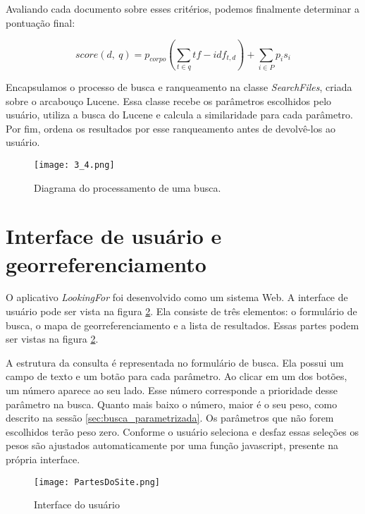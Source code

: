 Avaliando cada documento sobre esses critérios, podemos finalmente determinar a pontuação final:

\begin{displaymath}
	score(d,\ q) = p_{corpo} \left(\sum_{t \in q} tf - idf_{t,d}\right) + \sum_{i \in P} p_{i} s_{i}
\end{displaymath}

Encapsulamos o processo de busca e ranqueamento na classe \emph{SearchFiles}, criada sobre o arcabouço Lucene. Essa classe recebe os parâmetros escolhidos pelo usuário, utiliza a busca do Lucene e calcula a similaridade para cada parâmetro. Por fim, ordena os resultados por esse ranqueamento antes de devolvê-los ao usuário.

\begin{figure}[!h]
  \centering
  \texttt{[image: 3\_4.png]} 
  \caption{Diagrama do processamento de uma busca.}
  \label{fig:diagproc} 
\end{figure}

\section{Interface de usuário e georreferenciamento}
\label{sec:interface_usuario}

O aplicativo \emph{LookingFor} foi desenvolvido como um sistema Web. A interface de usuário pode ser vista na figura \ref{fig:interfusu}. Ela consiste de três elementos: o formulário de busca, o mapa de georreferenciamento e a lista de resultados. Essas partes podem ser vistas na figura \ref{fig:interfusu}.

A estrutura da consulta é representada no formulário de busca. Ela possui um campo de texto e um botão para cada parâmetro. Ao clicar em um dos botões, um número aparece ao seu lado. Esse número corresponde a prioridade desse parâmetro na busca. Quanto mais baixo o número, maior é o seu peso, como descrito na sessão \ref{sec:busca_parametrizada}. Os parâmetros que não forem escolhidos terão peso zero. Conforme o usuário seleciona e desfaz essas seleções os pesos são ajustados automaticamente por uma função javascript, presente na própria interface.

\begin{figure}[!h]
  \centering
  \texttt{[image: PartesDoSite.png]} 
  \caption{Interface do usuário}
  \label{fig:interfusu} 
\end{figure}

